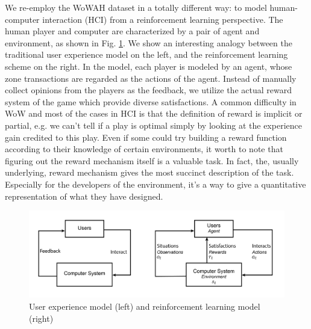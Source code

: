 \documentclass{sigchi}
\begin{document}
We re-employ the WoWAH dataset in a totally different way: to model human-computer interaction (HCI) from a reinforcement learning perspective. 
The human player and computer are characterized by a pair of agent and environment, as shown in Fig. \ref{fig:chi}. 
We show an interesting analogy between the traditional user experience model on the left, and the reinforcement learning scheme on the right. 
In the model, each player is modeled by an agent, whose zone transactions are regarded as the actions of the agent. 
Instead of manually collect opinions from the players as the feedback, we utilize the actual reward system of the game which provide diverse satisfactions.
A common difficulty in WoW and most of the cases in HCI is that the definition of reward is implicit or partial, e.g. we can't tell if a play is optimal simply by looking at the experience gain credited to this play. 
Even if some could try building a reward function according to their knowledge of certain environments, it worth to note that figuring out the reward mechanism itself is a valuable task. 
In fact, the, usually underlying, reward mechanism gives the most succinct description of the task. 
Especially for the developers of the environment, it's a way to give a quantitative representation of what they have designed.

\begin{figure}[t]
    \centering
    \includegraphics[width=\textwidth]{figs/rl-vs-chi.jpg}
    \caption{User experience model (left) and reinforcement learning model (right)}
    \label{fig:chi}
\end{figure}
\end{document}
